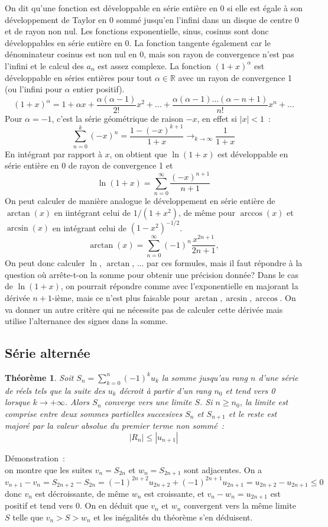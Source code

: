 \documentclass[a4paper,11pt]{article}
\newtheorem{thm}{Théorème}
\newcommand{\R}{{\mathbb{R}}}
\begin{document}
\begin{giacjshere}
On dit qu'une fonction est développable en série entière en 0 si
elle est égale à son développement de Taylor en 0 sommé jusqu'en l'infini
dans un disque de centre 0 et de rayon non nul. Les fonctions
exponentielle, sinus, cosinus sont donc développables en série entière en 0.
La fonction tangente également car le dénominateur cosinus est non nul en 0,
mais son rayon de convergence n'est pas l'infini et le calcul des $a_n$
est assez complexe.
La fonction $(1+x)^\alpha$ est développable en séries entières
pour tout $\alpha \in \R$ avec un rayon de convergence 1 (ou l'infini
pour $\alpha $ entier positif). 
\[ (1+x)^\alpha = 1 + \alpha x + \frac{\alpha (\alpha-1)}{2!} x^2 +
... + \frac{\alpha (\alpha-1) ... (\alpha -n +1)}{n!} x^n + ...\]
Pour $\alpha=-1$, c'est la série 
géométrique de raison $-x$, en effet si $|x|<1$~:
\[ \sum_{n=0}^k (-x)^n = \frac{1-(-x)^{k+1}}{1+x} 
\rightarrow_{k\rightarrow \infty} \frac{1}{1+x}
\]
En intégrant par rapport à $x$, on obtient que $\ln(1+x)$ est développable
en série entière en 0 de rayon de convergence 1 et
\[ \ln(1+x) = \sum_{n=0}^\infty \frac{(-x)^{n+1}}{n+1} \]
On peut calculer de manière analogue le développement en série entière
de $\arctan(x)$ en iintégrant celui de $1/(1+x^2)$, de même pour $\arccos(x)$
et $\arcsin(x)$ en intégrant celui de $(1-x^2)^{-1/2}$.
\[ \arctan(x)=\sum_{n=0}^\infty (-1)^{n} \frac{x^{2n+1}}{2n+1},
\]
On peut donc calculer $\ln$, $\arctan$, ... par ces formules, 
mais il faut répondre
à la question où arrête-t-on la somme pour obtenir une précision donnée? 
Dans le cas de $\ln(1+x)$,
on pourrait répondre comme avec l'exponentielle en majorant la dérivée
$n+1$-ième, mais ce n'est plus faisable pour $\arctan, \arcsin, \arccos$.
On va donner un autre critère qui ne nécessite pas
de calculer cette dérivée mais utilise l'alternance des signes
dans la somme.

\subsection{Série alternée}
\begin{thm}
Soit $S_n= \sum_{k=0}^n (-1)^k u_k$ la somme jusqu'au rang $n$ d'une
s\'erie de r\'eels tels que la suite des $u_k$ d\'ecroit \`a partir
d'un rang $n_0$ et tend vers 0
lorsque $k\rightarrow +\infty$. Alors $S_n$ converge vers une limite
$S$. Si $n\geq n_0$, la limite est comprise entre deux sommes
partielles succesives $S_n$ et $S_{n+1}$ et le reste est major\'e par
la valeur absolue du premier terme non somm\'e~:
\[ |R_n| \leq |u_{n+1}|\]
\end{thm}
D\'emonstration~:\\
on montre que les suites $v_n=S_{2n}$ et $w_n=S_{2n+1}$ sont
adjacentes. On a 
\[ v_{n+1}-v_n= S_{2n+2}-S_{2n}= (-1)^{2n+2} u_{2n+2} + (-1)^{2n+1}
u_{2n+1} = u_{2n+2}-u_{2n+1} \leq 0\]
donc $v_n$ est d\'ecroissante, de m\^eme $w_n$ est croissante,
et $v_n-w_n=u_{2n+1}$ est positif et tend vers 0. On en d\'eduit que
$v_n$ et $w_n$ convergent vers la m\^eme limite $S$ telle que
$v_n>S>w_n$ et les in\'egalit\'es du th\'eor\`eme s'en d\'eduisent.


\end{giacjshere}
\end{document}
